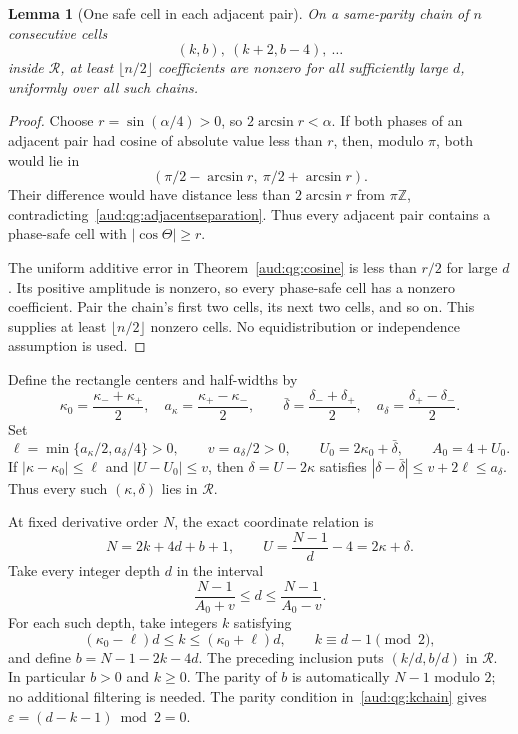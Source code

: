 \documentclass[11pt,a4paper]{article}
\numberwithin{equation}{section}
\newtheorem{lemma}[theorem]{Lemma}
\begin{document}
\begin{lemma}[One safe cell in each adjacent pair]\label{aud:qg:paircount}
On a same-parity chain of $n$ consecutive cells
\[
 (k,b),\ (k+2,b-4),\ \ldots
\]
inside $\mathcal R$, at least $\lfloor n/2\rfloor$ coefficients are nonzero for all sufficiently large $d$, uniformly over all such chains.
\end{lemma}
\begin{proof}
Choose $r=\sin(\alpha/4)>0$, so $2\arcsin r<\alpha$. If both phases of an adjacent pair had cosine of absolute value less than $r$, then, modulo $\pi$, both would lie in
\[
 (\pi/2-\arcsin r,\ \pi/2+\arcsin r).
\]
Their difference would have distance less than $2\arcsin r$ from $\pi\mathbb Z$, contradicting~\eqref{aud:qg:adjacentseparation}. Thus every adjacent pair contains a phase-safe cell with $|\cos\Theta|\ge r$.

The uniform additive error in Theorem~\ref{aud:qg:cosine} is less than $r/2$ for large $d$. Its positive amplitude is nonzero, so every phase-safe cell has a nonzero coefficient. Pair the chain's first two cells, its next two cells, and so on. This supplies at least $\lfloor n/2\rfloor$ nonzero cells. No equidistribution or independence assumption is used.
\end{proof}

Define the rectangle centers and half-widths by
\[
 \kappa_0=\frac{\kappa_-+\kappa_+}{2},\quad
 a_\kappa=\frac{\kappa_+-\kappa_-}{2},\qquad
 \bar\delta=\frac{\delta_-+\delta_+}{2},\quad
 a_\delta=\frac{\delta_+-\delta_-}{2}.
\]
Set
\begin{equation}\label{aud:qg:patchconstants}
 \ell=\min\{a_\kappa/2,a_\delta/4\}>0,\qquad
 v=a_\delta/2>0,\qquad
 U_0=2\kappa_0+\bar\delta,\qquad A_0=4+U_0.
\end{equation}
If $|\kappa-\kappa_0|\le\ell$ and $|U-U_0|\le v$, then $\delta=U-2\kappa$ satisfies $|\delta-\bar\delta|\le v+2\ell\le a_\delta$. Thus every such $(\kappa,\delta)$ lies in $\mathcal R$.

At fixed derivative order $N$, the exact coordinate relation is
\begin{equation}\label{aud:qg:ordercoordinate}
 N=2k+4d+b+1,\qquad
 U=\frac{N-1}{d}-4=2\kappa+\delta.
\end{equation}
Take every integer depth $d$ in the interval
\begin{equation}\label{aud:qg:depthinterval}
 \frac{N-1}{A_0+v}\le d\le\frac{N-1}{A_0-v}.
\end{equation}
For each such depth, take integers $k$ satisfying
\begin{equation}\label{aud:qg:kchain}
 (\kappa_0-\ell)d\le k\le(\kappa_0+\ell)d,
 \qquad k\equiv d-1\pmod2,
\end{equation}
and define $b=N-1-2k-4d$. The preceding inclusion puts $(k/d,b/d)$ in $\mathcal R$. In particular $b>0$ and $k\ge0$. The parity of $b$ is automatically $N-1$ modulo $2$; no additional filtering is needed. The parity condition in~\eqref{aud:qg:kchain} gives $\varepsilon=(d-k-1)\bmod2=0$.
\end{document}
